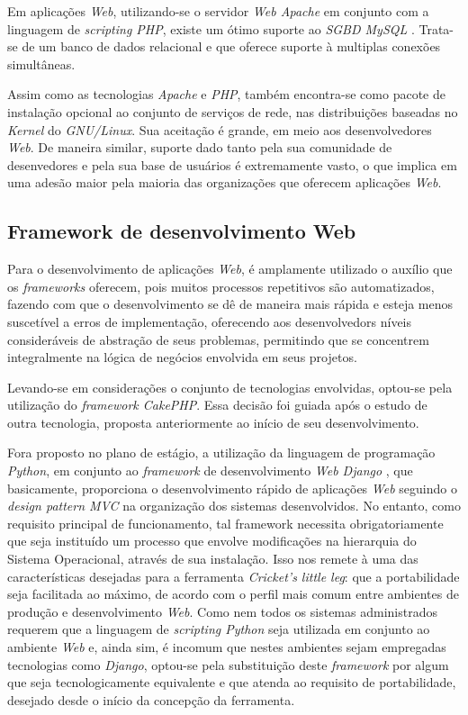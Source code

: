 Em aplicações \textit{Web}, utilizando-se o servidor \textit{Web Apache} em conjunto com a linguagem de \textit{scripting PHP}, existe um ótimo suporte ao \textit{SGBD MySQL} \cite{php5PowerProgramming}. Trata-se de um banco de dados relacional e que oferece suporte à multiplas conexões simultâneas. \cite{MySQLreference}

Assim como as tecnologias \textit{Apache} e \textit{PHP}, também encontra-se como pacote de instalação opcional ao conjunto de serviços de rede, nas distribuições baseadas no \textit{Kernel} do \textit{GNU/Linux}. Sua aceitação é grande, em meio aos desenvolvedores \textit{Web}. De maneira similar, suporte dado tanto pela sua comunidade de desenvedores e pela sua base de usuários é extremamente vasto, o que implica em uma adesão maior pela maioria das organizações que oferecem aplicações \textit{Web}.

\subsection{Framework de desenvolvimento Web}

Para o desenvolvimento de aplicações \textit{Web}, é amplamente utilizado o auxílio que os \textit{frameworks} oferecem, pois muitos processos repetitivos são automatizados, fazendo com que o desenvolvimento se dê de maneira mais rápida e esteja menos suscetível a erros de implementação, oferecendo aos desenvolvedors níveis consideráveis de abstração de seus problemas, permitindo que se concentrem integralmente na lógica de negócios envolvida em seus projetos.

Levando-se em considerações o conjunto de tecnologias envolvidas, optou-se pela utilização do \textit{framework CakePHP}. Essa decisão foi guiada após o estudo de outra tecnologia, proposta anteriormente ao início de seu desenvolvimento.

Fora proposto no plano de estágio, a utilização da linguagem de programação \textit{Python}, em conjunto ao \textit{framework} de desenvolvimento \textit{Web Django} \cite{Django}, que basicamente, proporciona o desenvolvimento rápido de aplicações \textit{Web} seguindo o \textit{design pattern MVC} na organização dos sistemas desenvolvidos. No entanto, como requisito principal de funcionamento, tal framework necessita obrigatoriamente que seja instituído um processo que envolve modificações na hierarquia do Sistema Operacional, através de sua instalação. Isso nos remete à uma das características desejadas para a ferramenta \textit{Cricket's little leg}: que a portabilidade seja facilitada ao máximo, de acordo com o perfil mais comum entre ambientes de produção e desenvolvimento \textit{Web}. Como nem todos os sistemas administrados requerem que a linguagem de \textit{scripting Python} seja utilizada em conjunto ao ambiente \textit{Web} e, ainda sim, é incomum que nestes ambientes sejam empregadas tecnologias como \textit{Django}, optou-se pela substituição deste \textit{framework} por algum que seja tecnologicamente equivalente e que atenda ao requisito de portabilidade, desejado desde o início da concepção da ferramenta.

